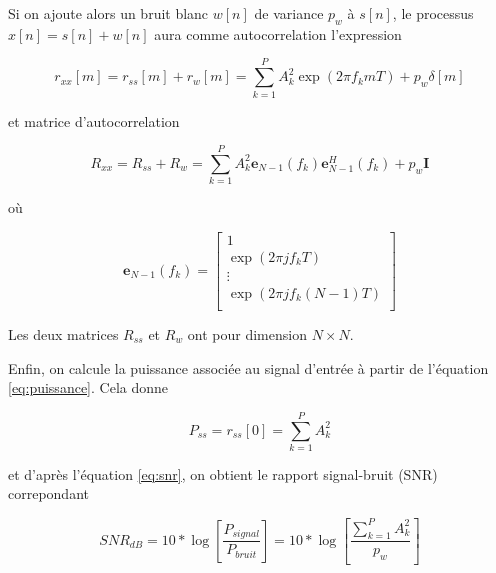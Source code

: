 \documentclass{article}
\begin{document}
\vspace*{15pt}

Si on ajoute alors un bruit blanc \(w[n]\) de variance \(p_w\) à \(s[n]\), le processus \(x[n] = s[n] + w[n]\) aura comme autocorrelation l'expression

\begin{equation}
\label{eq:ryy}
    r_{xx}[m] = r_{ss}[m] + r_{w}[m] = \sum_{k=1}^{P} A_k^2 \exp(2\pi f_k m T) + p_w\delta [m]
\end{equation}

et matrice d'autocorrelation 

\begin{equation}
%
    \label{eq:Ryy}
    R_{xx}= R_{ss} + R_w =\sum_{k=1}^{P}A_k^2 \boldsymbol{e}_{N-1}(f_k) \boldsymbol{e}_{N-1}^H(f_k) + p_w\boldsymbol{I}
%
\end{equation}

où 

\begin{equation}
%
    \label{eq:em}
    \boldsymbol{e}_{N-1}(f_k)=\begin{bmatrix}
        1 \\
        \exp (2 \pi j f_k T) \\
        \vdots \\
        \exp (2 \pi j f_k (N-1)T) \\
    \end{bmatrix}
%
\end{equation}

\vspace*{15pt}

Les deux matrices \(R_{ss}\) et \(R_{w}\) ont pour dimension \(N\times N\).

\vspace*{15pt}

Enfin, on calcule la puissance associée au signal d'entrée à partir de l'équation \ref{eq:puissance}. Cela donne

\begin{equation}
    P_{ss} = r_{ss} [0] = \sum_{k=1}^{P}A_k^2
\end{equation}

et d'après l'équation \ref{eq:snr}, on obtient le rapport signal-bruit (SNR) correpondant

\begin{equation}
    SNR_{dB} = 10* \log \left[ \frac{P_{signal}}{P_{bruit}} \right] = 10* \log \left[ \frac{\sum_{k=1}^{P}A_k^2}{p_w} \right]
\end{equation}
\end{document}
